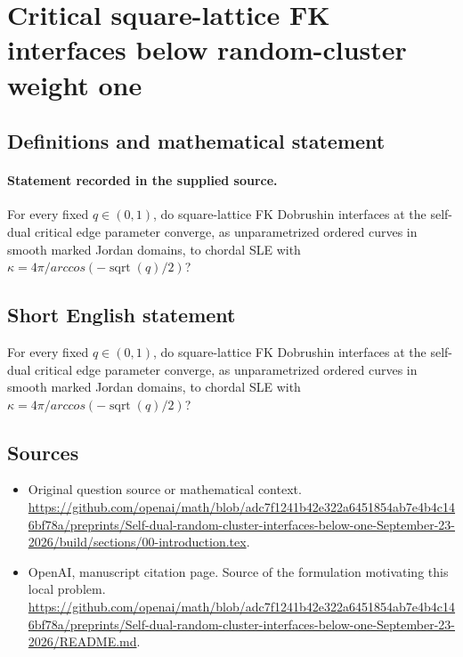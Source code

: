 \documentclass[11pt]{article}
\begin{document}
\section*{Critical square-lattice FK interfaces below random-cluster weight one}\label{statement}
\subsection{Definitions and mathematical statement}
\paragraph{Statement recorded in the supplied source.}
For every fixed $q\in (0,1)$, do square-lattice FK Dobrushin interfaces at the self-dual critical edge parameter converge, as unparametrized ordered curves in smooth marked Jordan domains, to chordal SLE with $\kappa =4\pi /arccos(-\operatorname{sqrt}(q)/2)$?
\subsection{Short English statement}
For every fixed $q\in (0,1)$, do square-lattice FK Dobrushin interfaces at the self-dual critical edge parameter converge, as unparametrized ordered curves in smooth marked Jordan domains, to chordal SLE with $\kappa =4\pi /arccos(-\operatorname{sqrt}(q)/2)$?
\subsection{Sources}
\begin{itemize}
\item[S1] Original question source or mathematical context.
\url{https://github.com/openai/math/blob/adc7f1241b42e322a6451854ab7e4b4c146bf78a/preprints/Self-dual-random-cluster-interfaces-below-one-September-23-2026/build/sections/00-introduction.tex}.
\item[S2] OpenAI, manuscript citation page. Source of the formulation motivating this local problem.
\url{https://github.com/openai/math/blob/adc7f1241b42e322a6451854ab7e4b4c146bf78a/preprints/Self-dual-random-cluster-interfaces-below-one-September-23-2026/README.md}.
\end{itemize}
\end{document}
